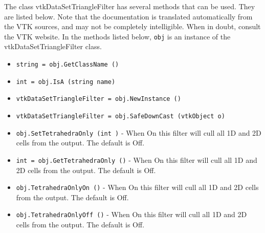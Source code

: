 The class vtkDataSetTriangleFilter has several methods that can be used.
  They are listed below.
Note that the documentation is translated automatically from the VTK sources,
and may not be completely intelligible.  When in doubt, consult the VTK website.
In the methods listed below, \verb|obj| is an instance of the vtkDataSetTriangleFilter class.
\begin{itemize}
\item  \verb|string = obj.GetClassName ()|

\item  \verb|int = obj.IsA (string name)|

\item  \verb|vtkDataSetTriangleFilter = obj.NewInstance ()|

\item  \verb|vtkDataSetTriangleFilter = obj.SafeDownCast (vtkObject o)|

\item  \verb|obj.SetTetrahedraOnly (int )| -  When On this filter will cull all 1D and 2D cells from the output.
 The default is Off.

\item  \verb|int = obj.GetTetrahedraOnly ()| -  When On this filter will cull all 1D and 2D cells from the output.
 The default is Off.

\item  \verb|obj.TetrahedraOnlyOn ()| -  When On this filter will cull all 1D and 2D cells from the output.
 The default is Off.

\item  \verb|obj.TetrahedraOnlyOff ()| -  When On this filter will cull all 1D and 2D cells from the output.
 The default is Off.

\end{itemize}
